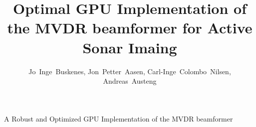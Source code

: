 \documentclass[12pt,journal,captionsoff,onecolumn]{IEEEtran}
\newcommand\1{\vec 1}
\begin{document}
\title{Optimal GPU Implementation of the MVDR beamformer for Active Sonar Imaing}

\author{Jo~Inge~Buskenes, %
        Jon~Petter~Aasen, %
        Carl-Inge~Colombo~Nilsen, %
        Andreas~Austeng%

}

%
{A Robust and Optimized GPU Implementation of the MVDR beamformer}


\end{document}
